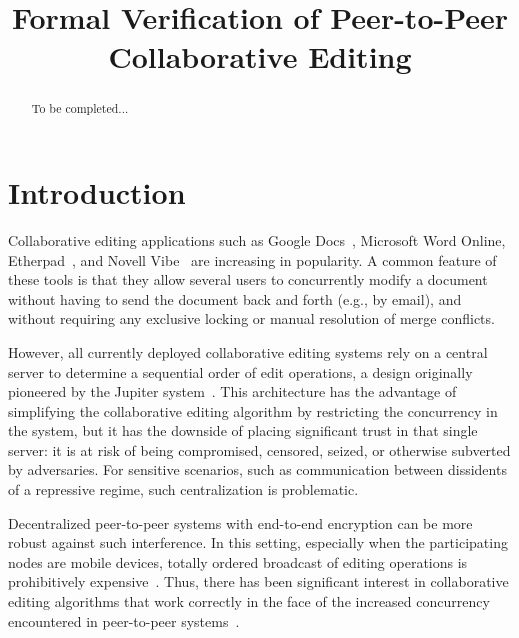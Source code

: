 \documentclass[acmlarge,review,anonymous]{acmart}\settopmatter{printfolios=true}
\begin{document}
\title{Formal Verification of Peer-to-Peer Collaborative Editing}

\maketitle

\begin{abstract}
To be completed...
\end{abstract}


\section{Introduction}
\label{sect.introduction}

Collaborative editing applications such as Google Docs~\cite{DayRichter:2010tt}, Microsoft Word
Online, Etherpad~\cite{Etherpad:2011um}, and Novell Vibe~\cite{Spiewak:2010vw} are increasing in
popularity. A common feature of these tools is that they allow several users to concurrently modify
a document without having to send the document back and forth (e.g., by email), and without
requiring any exclusive locking or manual resolution of merge conflicts.

However, all currently deployed collaborative editing systems rely on a central server to determine
a sequential order of edit operations, a design originally pioneered by the Jupiter
system~\cite{Nichols:1995fd}. This architecture has the advantage of simplifying the collaborative
editing algorithm by restricting the concurrency in the system, but it has the downside of placing
significant trust in that single server: it is at risk of being compromised, censored, seized, or
otherwise subverted by adversaries. For sensitive scenarios, such as communication between
dissidents of a repressive regime, such centralization is problematic.

Decentralized peer-to-peer systems with end-to-end encryption can be more robust against such
interference. In this setting, especially when the participating nodes are mobile devices, totally
ordered broadcast of editing operations is prohibitively expensive~\cite{Attiya:2015dm}. Thus, there
has been significant interest in collaborative editing algorithms that work correctly in the face of
the increased concurrency encountered in peer-to-peer systems~\cite{Randolph:2015gj}.
\end{document}
